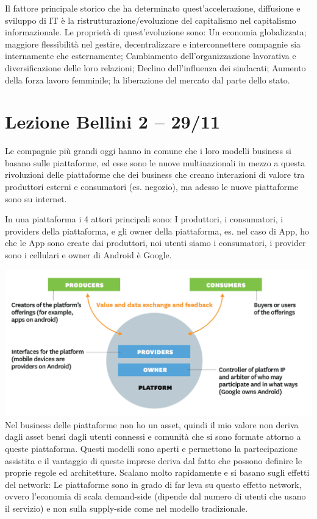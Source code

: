 \documentclass[a4page, 11pt]{article}
\begin{document}
Il fattore principale storico che ha determinato quest'accelerazione,
diffusione e sviluppo di IT è la ristrutturazione/evoluzione del
capitalismo nel capitalismo informazionale. Le proprietà di
quest'evoluzione sono: Un economia globalizzata; maggiore flessibilità
nel gestire, decentralizzare e interconnettere compagnie sia
internamente che esternamente; Cambiamento dell'organizzazione
lavorativa e diversificazione delle loro relazioni; Declino
dell'influenza dei sindacati; Aumento della forza lavoro femminile; la
liberazione del mercato dal parte dello stato.
\section*{Lezione Bellini 2 -- 29/11}

Le compagnie più grandi oggi hanno in comune che i loro modelli business
si basano sulle piattaforme, ed esse sono le nuove multinazionali in
mezzo a questa rivoluzioni delle piattaforme che dei business che creano
interazioni di valore tra produttori esterni e consumatori (es.
negozio), ma adesso le nuove piattaforme sono su internet.

In una piattaforma i 4 attori principali sono: I produttori, i
consumatori, i providers della piattaforma, e gli owner della
piattaforma, es. nel caso di App, ho che le App sono create dai
produttori, noi utenti siamo i consumatori, i provider sono i cellulari
e owner di Android è Google.

\includegraphics[scale=0.4]{image4.png} \newline
Nel business delle piattaforme non ho un asset, quindi il mio valore non
deriva dagli asset bensì dagli utenti connessi e comunità che si sono
formate attorno a queste piattaforma. Questi modelli sono aperti e
permettono la partecipazione assistita e il vantaggio di queste imprese
deriva dal fatto che possono definire le proprie regole ed architetture.
Scalano molto rapidamente e si basano sugli effetti del network: Le
piattaforme sono in grado di far leva su questo effetto network, ovvero
l'economia di scala demand-side (dipende dal numero di utenti che usano
il servizio) e non sulla supply-side come nel modello tradizionale.
\end{document}
